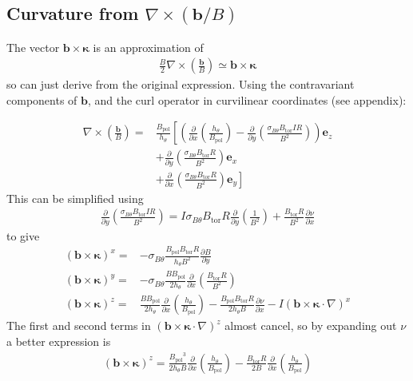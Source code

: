 \documentclass[12pt]{article}
\def\L{\left}
\def\R{\right}
\newcommand{\sbt}{\ensuremath{\sigma_{B\theta}}}
\newcommand{\deriv}[2]{\ensuremath{\frac{\partial #1}{\partial #2}}}
\newcommand{\hthe}{\ensuremath{h_\theta}}
\newcommand{\Bp}{\ensuremath{B_{\text{pol}}}}
\newcommand{\Bt}{\ensuremath{B_{\text{tor}}}}
\newcommand{\ve}[1]{\ensuremath{\boldsymbol{#1}}}
\newcommand{\bvec}{\ve{b}}
\newcommand{\kvec}{\ve{\kappa}}
\newcommand{\bxk}{\bvec\times\kvec\cdot\nabla}
\begin{document}
\subsection{Curvature from \texorpdfstring{$\nabla\times\L(\bvec / B\R)$}
%
{div (b/B)}} The vector $\bvec\times\kvec$ is an approximation of
%
\begin{align*}
\frac{B}{2}\nabla\times\L(\frac{\bvec}{B}\R) \simeq \bvec\times\kvec
\end{align*}
%
so can just derive from the original expression. Using the contravariant
components of $\bvec$, and the curl operator in curvilinear coordinates (see
appendix):

%
\begin{align*}
\nabla\times\L(\frac{\bvec}{B}\R) =&
    \frac{\Bp}{\hthe}\L[\L(\deriv{}{x}\L(\frac{\hthe}{\Bp}\R) -
    \deriv{}{y}\L(\frac{\sbt\Bt IR}{B^2}\R)\R)\ve{e}_z \R.  \\ &+
    \deriv{}{y}\L(\frac{\sbt\Bt R}{B^2}\R)\ve{e}_x \\ &+
    \L.\deriv{}{x}\L(\frac{\sbt\Bt R}{B^2}\R)\ve{e}_y\R]
\end{align*}
%
This can be simplified using
%
\begin{align*}
\deriv{}{y}\L(\frac{\sbt\Bt IR}{B^2}\R) = I\sbt\Bt
R\deriv{}{y}\L(\frac{1}{B^2}\R) + \frac{\Bt R}{B^2}\deriv{\nu}{x}
\end{align*}
%
to give
%
\begin{align*}
  \L(\bvec\times\kvec\R)^x =& -\sbt\frac{\Bp\Bt R}{\hthe B^2}\deriv{B}{y} \\
    \L(\bvec\times\kvec\R)^y =& -\sbt\frac{B\Bp}{2\hthe}\deriv{}{x}\L(\frac{\Bt
R}{B^2}\R) \\ \L(\bvec\times\kvec\R)^z =&
    \frac{B\Bp}{2\hthe}\deriv{}{x}\L(\frac{\hthe}{\Bp}\R) - \frac{\Bp\Bt
    R}{2\hthe B}\deriv{\nu}{x} - I\L(\bxk\R)^x
\end{align*}
%
The first and second terms in $\L(\bxk\R)^z$ almost cancel, so by expanding out
$\nu$ a better expression is
%
\begin{align*}
\L(\bvec\times\kvec\R)^z = \frac{\Bp^3}{2\hthe
B}\deriv{}{x}\L(\frac{\hthe}{\Bp}\R) - \frac{\Bt
R}{2B}\deriv{}{x}\L(\frac{\hthe}{\Bp}\R)
\end{align*}
%
\end{document}

